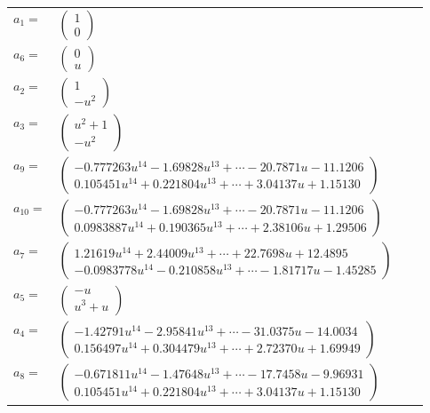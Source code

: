 \documentclass[1p]{elsarticle_modified}
\theoremstyle{definition}
\begin{document}
\begin{tabular}{m{7pt} m{180pt} m{7pt} m{180pt} }
\flushright $a_{1}=$&$\begin{pmatrix}1\\0\end{pmatrix}$ \\
\flushright $a_{6}=$&$\begin{pmatrix}0\\u\end{pmatrix}$ \\
\flushright $a_{2}=$&$\begin{pmatrix}1\\- u^2\end{pmatrix}$ \\
\flushright $a_{3}=$&$\begin{pmatrix}u^2+1\\- u^2\end{pmatrix}$ \\
\flushright $a_{9}=$&$\begin{pmatrix}-0.777263 u^{14}-1.69828 u^{13}+\cdots-20.7871 u-11.1206\\0.105451 u^{14}+0.221804 u^{13}+\cdots+3.04137 u+1.15130\end{pmatrix}$ \\
\flushright $a_{10}=$&$\begin{pmatrix}-0.777263 u^{14}-1.69828 u^{13}+\cdots-20.7871 u-11.1206\\0.0983887 u^{14}+0.190365 u^{13}+\cdots+2.38106 u+1.29506\end{pmatrix}$ \\
\flushright $a_{7}=$&$\begin{pmatrix}1.21619 u^{14}+2.44009 u^{13}+\cdots+22.7698 u+12.4895\\-0.0983778 u^{14}-0.210858 u^{13}+\cdots-1.81717 u-1.45285\end{pmatrix}$ \\
\flushright $a_{5}=$&$\begin{pmatrix}- u\\u^3+u\end{pmatrix}$ \\
\flushright $a_{4}=$&$\begin{pmatrix}-1.42791 u^{14}-2.95841 u^{13}+\cdots-31.0375 u-14.0034\\0.156497 u^{14}+0.304479 u^{13}+\cdots+2.72370 u+1.69949\end{pmatrix}$ \\
\flushright $a_{8}=$&$\begin{pmatrix}-0.671811 u^{14}-1.47648 u^{13}+\cdots-17.7458 u-9.96931\\0.105451 u^{14}+0.221804 u^{13}+\cdots+3.04137 u+1.15130\end{pmatrix}$ \\

\end{tabular}
\end{document}

